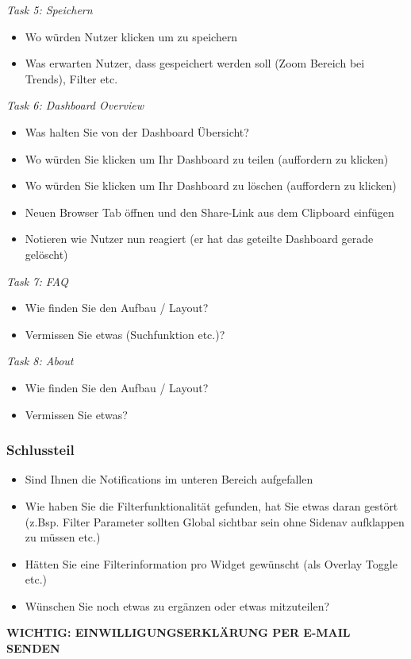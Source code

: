 \documentclass[12pt, oneside]{article}
\begin{document}
\textit{Task 5: Speichern}
\begin{itemize}
\item Wo würden Nutzer klicken um zu speichern
\item Was erwarten Nutzer, dass gespeichert werden soll (Zoom Bereich bei Trends), Filter etc.
\end{itemize}

\textit{Task 6: Dashboard Overview}
\begin{itemize}
\item Was halten Sie von der Dashboard Übersicht?
\item Wo würden Sie klicken um Ihr Dashboard zu teilen (auffordern zu klicken)
\item Wo würden Sie klicken um Ihr Dashboard zu löschen (auffordern zu klicken)
\item Neuen Browser Tab öffnen und den Share-Link aus dem Clipboard einfügen
\item Notieren wie Nutzer nun reagiert (er hat das geteilte Dashboard gerade gelöscht)
\end{itemize}

\textit{Task 7: FAQ}
\begin{itemize}
\item Wie finden Sie den Aufbau / Layout?
\item Vermissen Sie etwas (Suchfunktion etc.)?
\end{itemize}

\textit{Task 8: About}
\begin{itemize}
\item Wie finden Sie den Aufbau / Layout?
\item Vermissen Sie etwas?
\end{itemize}


\subsubsection*{Schlussteil}
\begin{itemize}
    \item Sind Ihnen die Notifications im unteren Bereich aufgefallen
    \item Wie haben Sie die Filterfunktionalität gefunden, hat Sie etwas daran gestört (z.Bsp. Filter Parameter sollten Global sichtbar sein ohne Sidenav aufklappen zu müssen etc.)
    \item Hätten Sie eine Filterinformation pro Widget gewünscht (als Overlay Toggle etc.)
    \item Wünschen Sie noch etwas zu ergänzen oder etwas mitzuteilen?
\end{itemize}

\textbf{WICHTIG: EINWILLIGUNGSERKLÄRUNG PER E-MAIL SENDEN}
\end{document}
